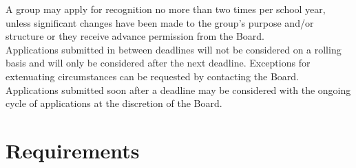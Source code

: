 \documentclass[12pt]{constitution}
\begin{document}
A group may apply for recognition no more than two times per school year, unless significant changes
    have been made to the group's purpose and/or structure or they receive advance permission from the
    Board.
\\

Applications submitted in between deadlines will not be considered on a rolling basis and will only be
    considered after the next deadline.
Exceptions for extenuating circumstances can be requested by contacting the Board.
Applications submitted soon after a deadline may be considered with the ongoing cycle of applications at
    the discretion of the Board.

\section{Requirements}
\end{document}

